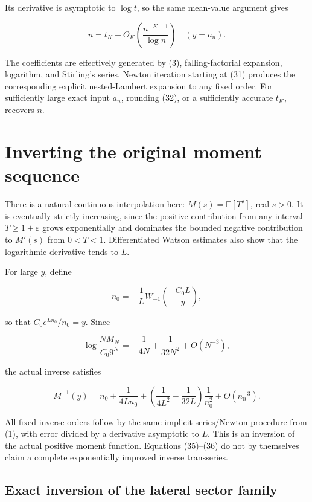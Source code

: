 \documentclass[11pt,letterpaper]{article}
\theoremstyle{remark}
\begin{document}
Its derivative is asymptotic to \(\log t\), so the same mean-value
argument gives

\[
n=t_K+O_K\!\left(\frac{n^{-K-1}}{\log n}\right)\quad(y=a_n).
\tag{34}
\]

The coefficients are effectively generated by (3), falling-factorial
expansion, logarithm, and Stirling's series. Newton iteration starting
at (31) produces the corresponding explicit nested-Lambert expansion to
any fixed order. For sufficiently large exact input \(a_n\), rounding
(32), or a sufficiently accurate \(t_K\), recovers \(n\).

\section{Inverting the original moment
sequence}\label{inverting-the-original-moment-sequence}

There is a natural continuous interpolation here:
\(M(s)=\mathbb E[T^s]\), real \(s>0\). It is eventually strictly
increasing, since the positive contribution from any interval
\(T\ge1+\varepsilon\) grows exponentially and dominates the bounded
negative contribution to \(M'(s)\) from \(0<T<1\). Differentiated Watson
estimates also show that the logarithmic derivative tends to \(L\).

For large \(y\), define

\[
n_0=-\frac1L W_{-1}\!\left(-\frac{C_0L}{y}\right),
\tag{35}
\]

so that \(C_0e^{Ln_0}/n_0=y\). Since

\[
\log\frac{NM_N}{C_0 9^N}=-\frac1{4N}+\frac1{32N^2}+O(N^{-3}),
\]

the actual inverse satisfies

\[
\boxed{\displaystyle M^{-1}(y)=n_0+\frac1{4Ln_0}
+\left(\frac1{4L^2}-\frac1{32L}\right)\frac1{n_0^2}
+O(n_0^{-3}).}
\tag{36}
\]

All fixed inverse orders follow by the same implicit-series/Newton
procedure from (1), with error divided by a derivative asymptotic to
\(L\). This is an inversion of the actual positive moment function.
Equations (35)--(36) do not by themselves claim a complete exponentially
improved inverse transseries.

\subsection{Exact inversion of the lateral sector
family}\label{exact-inversion-of-the-lateral-sector-family}
\end{document}
